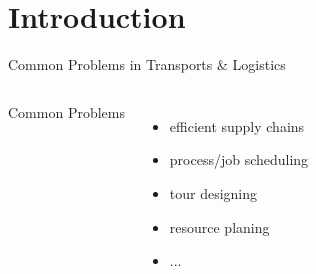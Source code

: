 \section[Intro]{Introduction}

\begin{frame}{}
  \begin{center}
    \structure{\Large \insertsection}
  \end{center}
\end{frame}

\begin{frame}{Common Problems in Transports \& Logistics}

  \begin{columns}[b]
  \column{150pt}
    Common Problems
    \begin{itemize}
      \item<2-> efficient supply chains
      \item<3-> process/job scheduling
      \item<4-> tour designing
      \item<5-> resource planing
      \item<5-> ...
    \end{itemize}
  \column{129pt}
  \end{columns}
\end{frame}

